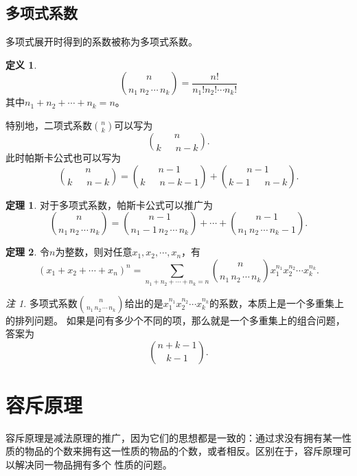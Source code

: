 \documentclass[a4paper,11pt]{article}%
\theoremstyle{remark}
\newtheorem*{remark}{注}
\theoremstyle{remark}
\theoremstyle{definition}
\newtheorem{theorem}{定理}[section]
\theoremstyle{definition}
\newtheorem*{definition}{定义}
\theoremstyle{definition}
\begin{document}
\subsection{多项式系数}
多项式展开时得到的系数被称为多项式系数。
\begin{definition}
    \[\binom{n}{n_1\,n_2\,\cdots\,n_k}=\frac{n!}{n_1!n_2!\cdots n_k!}\]
    其中$n_1+n_2+\cdots+n_k=n$。
\end{definition}
特别地，二项式系数$\binom{n}{k}$可以写为
\[\binom{n}{k\phantom{111}n-k}.\]
此时帕斯卡公式也可以写为
\[ \binom{n}{k\phantom{111}n-k}=\binom{n-1}{k\phantom{111}n-k-1}+\binom{n-1}{k-1\phantom{111}n-k}.\]
\begin{theorem}
    对于多项式系数，帕斯卡公式可以推广为
    \[\binom{n}{n_1\,n_2\,\cdots\,n_k}=\binom{n-1}{n_1-1\,n_2\,\cdots\,n_k}+\cdots+\binom{n-1}{n_1\,n_2\,\cdots\,n_k-1}.\]
\end{theorem}
\begin{theorem}
    令$n$为整数，则对任意$x_1,x_2,\cdots,x_n$，有 
    \[(x_1+x_2+\cdots+x_n)^n=\sum_{n_1+n_2+\cdots+n_k=n}\binom{n}{n_1\,n_2\,\cdots\,n_k}x_1^{n_1}x_2^{n_2}\cdots x_k^{n_k}.\]
\end{theorem}
\begin{remark}
    多项式系数$\binom{n}{n_1\,n_2\,\cdots\,n_k}$给出的是$x_1^{n_1}x_2^{n_2}\cdots x_k^{n_k}$的系数，本质上是一个多重集上的排列问题。
    如果是问有多少个不同的项，那么就是一个多重集上的组合问题，答案为
    \[\binom{n+k-1}{k-1}.\]
\end{remark}
\section{容斥原理}
容斥原理是减法原理的推广，因为它们的思想都是一致的：通过求没有拥有某一性质的物品的个数来拥有这一性质的物品的个数，或者相反。区别在于，容斥原理可以解决同一物品拥有多个
性质的问题。
\end{document}
